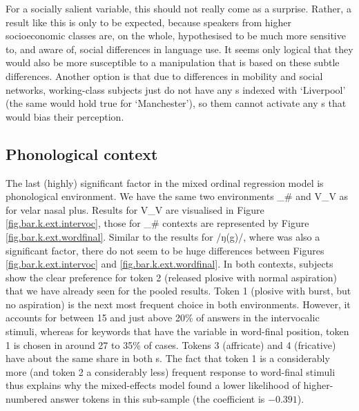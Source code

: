 For a socially salient variable, this should not really come as a surprise.
Rather, a result like this is only to be expected, because speakers from higher socioeconomic classes are, on the whole, hypothesised to be much more sensitive to, and aware of, social differences in language use.
It seems only logical that they would also be more susceptible to a manipulation that is based on these subtle differences.
Another option is that due to differences in mobility and social networks, working-class subjects just do not have any s indexed with `Liverpool' (the same would hold true for `Manchester'), so  them cannot activate any s that would bias their perception.

\subsection{Phonological context}
\label{sec.perc_res.k.phon}

The last (highly) significant factor in the mixed ordinal regression model is phonological environment.
We have the same two environments \_\# and V\_V as for velar nasal plus.
Results for V\_V are visualised in Figure \ref{fig.bar.k.ext.intervoc}, those for \_\# contexts are represented by Figure \ref{fig.bar.k.ext.wordfinal}.
Similar to the results for /ŋ(g)/, where  was also a significant factor, there do not seem to be huge differences between Figures \ref{fig.bar.k.ext.intervoc} and \ref{fig.bar.k.ext.wordfinal}.
In both contexts, subjects show the clear preference for token 2 (released plosive with normal aspiration) that we have already seen for the pooled results.
Token 1 (plosive with burst, but no aspiration) is the next most frequent choice in both environments.
However, it accounts for between 15 and just above 20\% of answers in the intervocalic stimuli, whereas for keywords that have the variable in word-final position, token 1 is chosen in around 27 to 35\% of cases.
Tokens 3 (affricate) and 4 (fricative) have about the same share in both s.
The fact that token 1 is a considerably more (and token 2 a considerably less) frequent response to word-final stimuli thus explains why the mixed-effects model found a lower likelihood of higher-numbered answer tokens in this sub-sample (the coefficient is \ensuremath{-0.391}).

